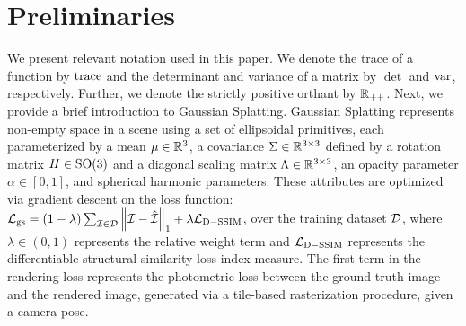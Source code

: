 \section{Preliminaries}
\label{sec:preliminaries}
We present relevant notation used in this paper. We denote the trace of a function by $\mathrm{trace}$ and the determinant and variance of a matrix by $\det$ and $\mathrm{var}$, respectively. Further, we denote the strictly positive orthant by ${\mathbb{R}_{++}}$. Next, we provide a brief introduction to Gaussian Splatting.
Gaussian Splatting represents non-empty space in a scene using a set of ellipsoidal primitives, each parameterized by a mean ${\mu \in \mathbb{R}^{3}}$, a covariance ${\Sigma \in \mathbb{R}^{3 \times 3}}$ defined by a rotation matrix ${H \in \mathrm{SO}(3)}$ and a diagonal scaling matrix ${\Lambda \in \mathbb{R}^{3 \times 3}}$, an opacity parameter ${\alpha \in [0, 1]}$, and spherical harmonic parameters. These attributes are optimized via gradient descent on the loss function: ${\mathcal{L}_{\mathrm{gs}} = (1 - \lambda) \sum_{\mathcal{I} \in \mathcal{D}} \left\Vert \mathcal{I} - \hat{\mathcal{I}} \right\Vert_{1} + \lambda \mathcal{L}_{\mathrm{D-SSIM}}}$, over the training dataset $\mathcal{D}$, where ${\lambda \in (0, 1)}$ represents the relative weight term and $\mathcal{L}_{\mathrm{D-SSIM}}$ represents the differentiable structural similarity loss index measure. The first term in the rendering loss represents the photometric loss between the ground-truth image and the rendered image, generated via a tile-based rasterization procedure, given a camera pose.